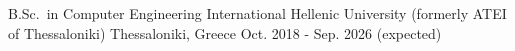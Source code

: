 

\begin{cventries}

  \cventry%
    {B.Sc.\ in Computer Engineering} %
    {International Hellenic University (formerly ATEI of Thessaloniki)} %
    {Thessaloniki, Greece} %
    {Oct. 2018 - Sep. 2026 (expected)} %
    {
    }

\end{cventries}
